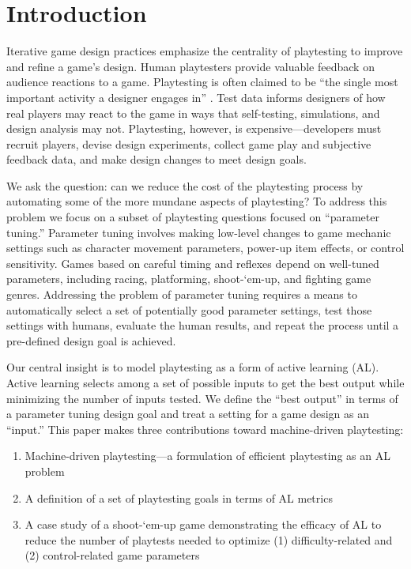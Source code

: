\documentclass{sig-alternate}
\begin{document}

\section{Introduction}



Iterative game design practices emphasize the centrality of playtesting to improve and refine a game's design.
Human playtesters provide valuable feedback on audience reactions to a game.
Playtesting is often claimed to be ``the single most important activity a designer engages in'' \cite{fullerton2008:playcentric}.
Test data informs designers of how real players may react to the game in ways that self-testing, simulations, and design analysis may not.
Playtesting, however, is expensive---developers must recruit players, devise design experiments, collect game play and subjective feedback data, and make design changes to meet design goals.


We ask the question: can we reduce the cost of the playtesting process by automating some of the more mundane aspects of playtesting?
To address this problem we focus on a subset of playtesting questions focused on ``parameter tuning.''
Parameter tuning involves making low-level changes to game mechanic settings such as character movement parameters, power-up item effects, or control sensitivity.
Games based on careful timing and reflexes depend on well-tuned parameters, including racing, platforming, shoot-`em-up, and fighting game genres.
Addressing the problem of parameter tuning requires a means to automatically select a set of potentially good parameter settings, test those settings with humans, evaluate the human results, and repeat the process until a pre-defined design goal is achieved.


Our central insight is to model playtesting as a form of active learning (AL).
Active learning \cite{settles2012:al-book} selects among a set of possible inputs to get the best output while minimizing the number of inputs tested.
We define the ``best output'' in terms of a parameter tuning design goal and treat a setting for a game design as an ``input.''
This paper makes three contributions toward machine-driven playtesting:
\begin{enumerate}
\item Machine-driven playtesting---a formulation of efficient playtesting as an AL problem %
\item A definition of a set of playtesting goals in terms of AL metrics
\item A case study of a shoot-`em-up game demonstrating the efficacy of AL to reduce the number of playtests needed to optimize (1) difficulty-related and (2) control-related game parameters
\end{enumerate}
\end{document}
